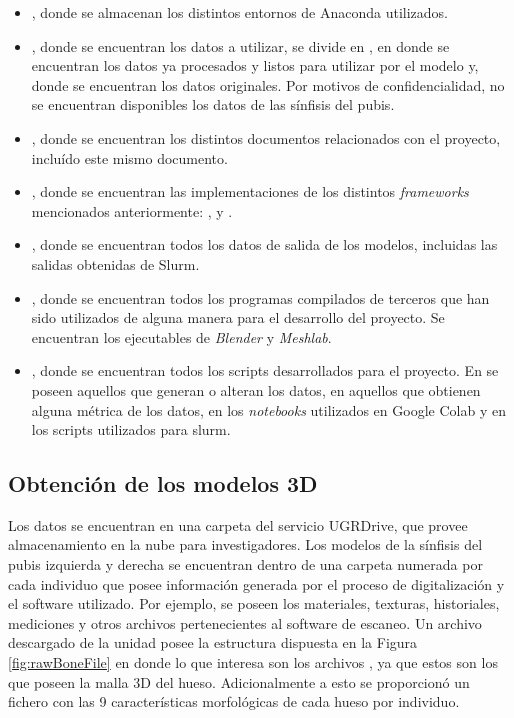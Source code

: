 \begin{itemize}
    \item {}, donde se almacenan los distintos entornos de Anaconda utilizados.
    \item {}, donde se encuentran los datos a utilizar, se divide en , en donde se encuentran los datos ya procesados y listos para utilizar por el modelo y,  donde se encuentran los datos originales. Por motivos de confidencialidad, no se encuentran disponibles los datos de las sínfisis del pubis.
    \item {}, donde se encuentran los distintos documentos relacionados con el proyecto, incluído este mismo documento.
    \item {}, donde se encuentran las implementaciones de los distintos \textit{frameworks} mencionados anteriormente: ,  y .
    \item {}, donde se encuentran todos los datos de salida de los modelos, incluidas las salidas obtenidas de Slurm.
    \item {}, donde se encuentran todos los programas compilados de terceros que han sido utilizados de alguna manera para el desarrollo del proyecto. Se encuentran los ejecutables de \textit{Blender} y \textit{Meshlab}.
    \item {}, donde se encuentran todos los scripts desarrollados para el proyecto. En  se poseen aquellos que generan o alteran los datos, en  aquellos que obtienen alguna métrica de los datos, en  los \textit{notebooks} utilizados en Google Colab y en  los scripts utilizados para slurm.
\end{itemize}

\subsection{Obtención de los modelos 3D}
\label{section:getting3Dmeshes}
Los datos se encuentran en una carpeta del servicio UGRDrive, que provee almacenamiento en la nube para investigadores. Los modelos de la sínfisis del pubis izquierda y derecha se encuentran dentro de una carpeta numerada por cada individuo que posee información generada por el proceso de digitalización y el software utilizado. Por ejemplo, se poseen los materiales, texturas, historiales, mediciones y otros archivos pertenecientes al software de escaneo. Un archivo descargado de la unidad posee la estructura dispuesta en la Figura \ref{fig:rawBoneFile} en donde lo que interesa son los archivos , ya que estos son los que poseen la malla 3D del hueso. Adicionalmente a esto se proporcionó un fichero  con las 9 características morfológicas de cada hueso por individuo.

